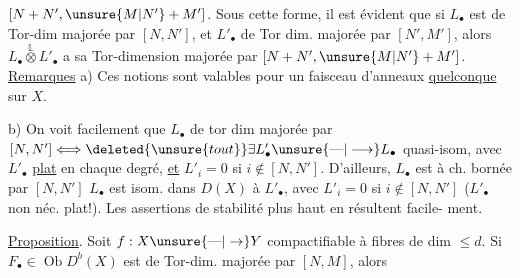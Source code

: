 \deleted{\unsure{$[N]$}} $[N+N',\unsure{M|N'}+M']$. Sous cette forme, il est
évident que si $L_\bullet$ est de Tor-dim
majorée par $[N,N']$, et $L'_\bullet$ de Tor dim.
majorée par $[N',M']$, alors $L_\bullet\overset{\mathbb L}{\otimes}L'_\bullet$ a sa
Tor-dimension majorée par $[N+N',\unsure{M|N'}+M']$.
\uline{Remarques} a) Ces notions sont valables pour un
faisceau d'anneaux \uline{quelconque} sur $X$.

b) On voit facilement que $L_\bullet$ de tor dim
majorée par $[N,N']\Longleftrightarrow\deleted{\unsure{tout}}\exists L'_\bullet\unsure{\text{---}|\longrightarrow}L_\bullet$
quasi-isom, avec $L'_\bullet$ \uline{plat} en chaque
degré, \uline{et} $L'_i=0$ si $i\notin[N,N']$. D'ailleurs,
$L_\bullet$ est à ch. bornée par $[N,N']$ 
 $L_\bullet$ est  isom. dans $D(X)$ à $L'_\bullet$,
avec \deleted{\unsure{$\exists$}} $L'_i=0$ si $i\notin[N,N']$
($L'_\bullet$ non néc. plat!). Les assertions de
stabilité plus haut en résultent facile-
ment.

\uline{Proposition}. Soit $f:X\unsure{\text{---}|\to}Y$ compactifiable à fibres
de dim $\le d$. Si $F_\bullet\in\operatorname{Ob}D^b(X)$ est de
Tor-dim. majorée par $[N,M]$, alors
